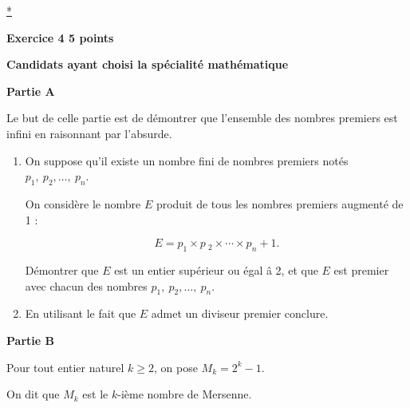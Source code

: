 \documentclass[10pt]{article}
\begin{document}
\hyperlink{Index}{*}

\vspace{0,5cm}

\textbf{Exercice 4 \hfill 5 points}

\textbf{Candidats ayant choisi la spécialité mathématique}

\medskip

\textbf{Partie A}

\medskip 

Le but de celle partie est de démontrer que l'ensemble des nombres premiers est infini en raisonnant par l'absurde.
\medskip
 
\begin{enumerate}
\item 

On suppose qu'il existe un nombre fini de nombres premiers notés $p_{1},\:  p_{2}, \ldots,\: p_{n}$. 

On considère le nombre $E$ produit de tous les nombres premiers augmenté de 1 :

\[E = p_{1} \times p~_{2} \times \cdots\times p_{n} + 1.\] 

Démontrer que $E$ est un entier supérieur ou égal â 2, et que $E$ est premier avec chacun des nombres $p_{1},\:  p_{2}, \ldots,\: p_{n}$. 
\item En utilisant le fait que $E$ admet un diviseur premier conclure.
\end{enumerate}

\bigskip
 
\textbf{Partie B}

\medskip 

Pour tout entier naturel $k \geqslant 2$, on pose $M_{k} = 2^k -1$.

On dit que $M_{k}$ est le $k$-ième nombre de Mersenne.

\medskip
  
\end{document}
